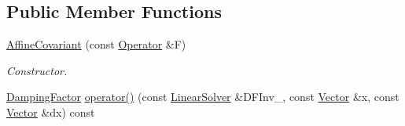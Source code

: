 \subsection*{Public Member Functions}
\begin{DoxyCompactItemize}
\item 
\hypertarget{classSpacy_1_1Newton_1_1Damping_1_1AffineCovariant_a316bca14949ace2b808f071a72191e5e}{}\hyperlink{classSpacy_1_1Newton_1_1Damping_1_1AffineCovariant_a316bca14949ace2b808f071a72191e5e}{Affine\+Covariant} (const \hyperlink{group__SpacyGroup_ga3f89622eba80cf840b2a7102f1303455_ga3f89622eba80cf840b2a7102f1303455}{Operator} \&F)\label{classSpacy_1_1Newton_1_1Damping_1_1AffineCovariant_a316bca14949ace2b808f071a72191e5e}

\begin{DoxyCompactList}\small\item\em Constructor. \end{DoxyCompactList}\item 
\hypertarget{classSpacy_1_1Newton_1_1Damping_1_1AffineCovariant_a6c83b5a335e93b256130c01d90499d3b}{}\hyperlink{classSpacy_1_1DampingFactor}{Damping\+Factor} \hyperlink{classSpacy_1_1Newton_1_1Damping_1_1AffineCovariant_a6c83b5a335e93b256130c01d90499d3b}{operator()} (const \hyperlink{namespaceSpacy_a7d5cd1c6fb9dd85aa345b536caf30bba_a7d5cd1c6fb9dd85aa345b536caf30bba}{Linear\+Solver} \&D\+F\+Inv\+\_\+, const \hyperlink{classSpacy_1_1Vector}{Vector} \&x, const \hyperlink{classSpacy_1_1Vector}{Vector} \&dx) const \label{classSpacy_1_1Newton_1_1Damping_1_1AffineCovariant_a6c83b5a335e93b256130c01d90499d3b}


\end{DoxyCompactItemize}

